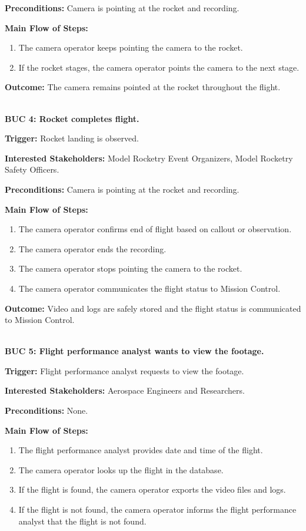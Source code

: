 \documentclass[12pt]{article}
\begin{document}
\textbf{Preconditions:} Camera is pointing at the rocket and recording.

\textbf{Main Flow of Steps:}
\begin{enumerate}
  \item The camera operator keeps pointing the camera to the rocket.
  \item If the rocket stages, the camera operator points the camera to the next stage.
\end{enumerate}

\textbf{Outcome:} The camera remains pointed at the rocket throughout the flight.

~\\

\textbf{BUC 4: Rocket completes flight.}

\textbf{Trigger:} Rocket landing is observed.

\textbf{Interested Stakeholders:} Model Rocketry Event Organizers, Model Rocketry Safety Officers.

\textbf{Preconditions:} Camera is pointing at the rocket and recording.

\textbf{Main Flow of Steps:}
\begin{enumerate}
  \item The camera operator confirms end of flight based on callout or observation.
  \item The camera operator ends the recording.
  \item The camera operator stops pointing the camera to the rocket.
  \item The camera operator communicates the flight status to Mission Control.
\end{enumerate}

\textbf{Outcome:} Video and logs are safely stored and the flight status is communicated to Mission Control.

~\\

\textbf{BUC 5: Flight performance analyst wants to view the footage.}

\textbf{Trigger:} Flight performance analyst requests to view the footage.

\textbf{Interested Stakeholders:} Aerospace Engineers and Researchers.

\textbf{Preconditions:} None.

\textbf{Main Flow of Steps:}
\begin{enumerate}
  \item The flight performance analyst provides date and time of the flight.
  \item The camera operator looks up the flight in the database.
  \item If the flight is found, the camera operator exports the video files and logs.
  \item If the flight is not found, the camera operator informs the flight performance
        analyst that the flight is not found.
\end{enumerate}
\end{document}
